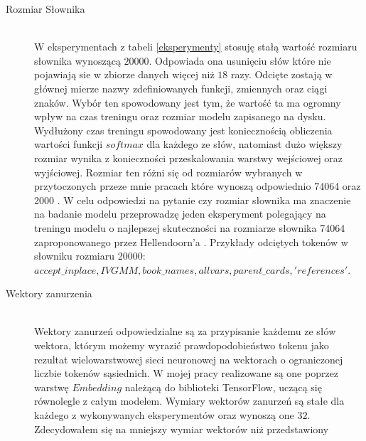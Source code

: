 \begin{description}
\item[Rozmiar Słownika]
\hfill \\
W eksperymentach z tabeli \ref{eksperymenty} stosuję stałą wartość rozmiaru słownika wynoszącą \begin{math}20000\end{math}. Odpowiada ona usunięciu słów które nie pojawiają sie w 
zbiorze danych więcej niż \begin{math}18\end{math} razy. Odcięte zostają w głównej mierze nazwy zdefiniowanych funkcji, zmiennych oraz ciągi znaków.
Wybór ten spowodowany jest tym, że wartość ta ma ogromny wpływ na czas treningu oraz rozmiar modelu zapisanego na dysku. 
Wydłużony czas treningu spowodowany jest koniecznością obliczenia wartości funkcji \begin{math}softmax\end{math} dla każdego ze słów, natomiast dużo większy rozmiar wynika z konieczności 
przeskalowania warstwy wejściowej oraz wyjściowej. Rozmiar ten różni się od rozmiarów wybranych w przytoczonych przeze mnie pracach które wynoszą odpowiednio 74064 \cite{hellendoorn} oraz 
2000 \cite{contextual_code_completion}. W celu odpowiedzi na pytanie czy rozmiar słownika ma znaczenie na badanie modelu przeprowadzę jeden eksperyment polegający na treningu modelu o najlepszej 
skuteczności na rozmiarze słownika 74064 zaproponowanego przez Hellendoorn'a \cite{hellendoorn}. 
Przykłady odciętych tokenów w słowniku rozmiaru 20000:\\ \begin{math}accept\_inplace, IVGMM, book\_names, allvars, parent\_cards, 'references'\end{math}.\\
\item[Wektory zanurzenia]
\hfill \\
Wektory zanurzeń odpowiedzialne są za przypisanie każdemu ze słów wektora, którym możemy wyrazić prawdopodobieństwo tokenu jako rezultat wielowarstwowej sieci neuronowej na wektorach 
o ograniczonej liczbie tokenów sąsiednich. W mojej pracy realizowane są one poprzez warstwę \begin{math}Embedding\end{math} należącą do biblioteki TensorFlow, uczącą się równolegle z całym modelem. 
Wymiary wektorów zanurzeń są stałe dla każdego z wykonywanych eksperymentów oraz wynoszą one \begin{math}32\end{math}. Zdecydowałem się na mniejszy wymiar wektorów niż przedstawiony 

\end{description}
